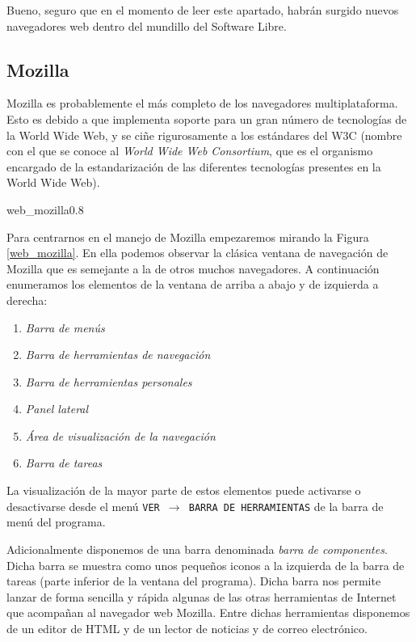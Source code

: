 Bueno, seguro que en el momento  de leer este apartado, habrán surgido
nuevos navegadores web dentro del mundillo del Software Libre.


\subsection{Mozilla}

{\sf  Mozilla} es  probablemente el  más completo  de los  navegadores
multiplataforma. Esto es debido a  que implementa soporte para un gran
número de tecnologías de la World  Wide Web, y se ciñe rigurosamente a
los estándares del W3C (nombre con el que se conoce al {\em World Wide
Web Consortium}, que  es el organismo encargado  de la estandarización
de las diferentes tecnologías presentes en la World Wide Web).

\begin{figura}{web_mozilla}{0.8}
\caption{Ventana del navegador web Mozilla}
\label{web_mozilla}
\end{figura}

Para centrarnos en  el manejo de {\sf Mozilla}  empezaremos mirando la
Figura \ref{web_mozilla}. En ella  podemos observar la clásica ventana
de navegación de  {\sf Mozilla} que es semejante a  la de otros muchos
navegadores. A continuación enumeramos los  elementos de la ventana de
arriba a abajo y de izquierda a derecha:

\begin{enumerate}

\item{{\em Barra de menús}}
\item{{\em Barra de herramientas de navegación}}
\item{{\em Barra de herramientas personales}}
\item{{\em Panel lateral}}
\item{{\em Área de visualización de la navegación}}
\item{{\em Barra de tareas}}

\end{enumerate}

La visualización de la mayor  parte de estos elementos puede activarse
o  desactivarse  desde  el  menú   {\tt  VER  $\rightarrow$  BARRA  DE
HERRAMIENTAS}  de  la  barra  de  menú  del  programa.

Adicionalmente  disponemos  de  una  barra denominada  {\em  barra  de
componentes}. Dicha  barra se muestra  como unos pequeños iconos  a la
izquierda de  la barra  de tareas  (parte inferior  de la  ventana del
programa). Dicha barra  nos permite lanzar de forma  sencilla y rápida
algunas  de  las  otras  herramientas de  Internet  que  acompañan  al
navegador web  {\sf Mozilla}. Entre dichas  herramientas disponemos de
un editor de HTML y de un lector de noticias y de correo electrónico.

